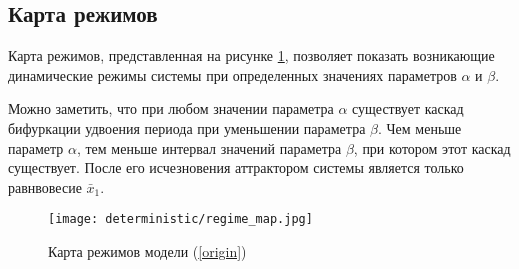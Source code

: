     \subsection{Карта режимов}

        Карта режимов, представленная на рисунке \ref{regimeMap}, позволяет показать возникающие динамические режимы системы при определенных значениях параметров \(\alpha\) и \(\beta\).

        Можно заметить, что при любом значении параметра \(\alpha\) существует каскад бифуркации удвоения периода при уменьшении параметра \(\beta\). Чем меньше параметр \(\alpha\), тем меньше интервал значений параметра \(\beta\), при котором этот каскад существует. После его исчезновения аттрактором системы является только равнвовесие \(\bar{x}_1\).

        \begin{figure}
            \centering
            \texttt{[image: deterministic/regime\_map.jpg]}

            \captionsetup{justification=centering}
            \caption{Карта режимов модели (\ref{origin})}
            \label{regimeMap}
        \end{figure}